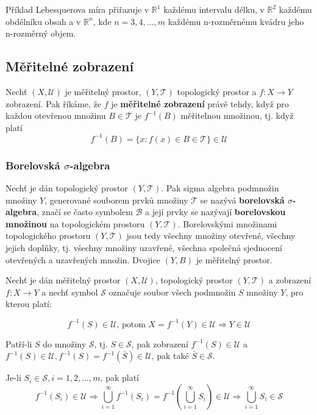 	\begin{note}{Příklad}
	Lebesquerova míra přiřazuje v $\mathbb{R}^1$ každému intervalu délku, v $\mathbb{R}^2$ každému obdélníku obsah a v $\mathbb{R}^n$, kde $n=3,4,\ldots, m$ každému n-rozměrnému kvádru jeho n-rozměrný objem.
	\end{note}
	
	\subsection{Měřitelné zobrazení}
	Nechť $(X,\mathscr{U})$ je měřitelný prostor, $(Y,\mathscr{T})$ topologický prostor a $f:X\to Y$ zobrazení. Pak říkáme, že $f$ je \textbf{měřitelné zobrazení} právě tehdy, když pro každou otevřenou množinu $B\in\mathscr{T}$ je $f^{-1}(B)$ měřitelnou množinou, tj. když platí
	\[ f^{-1}(B)=\big\{ x:f(x)\in B\in\mathscr{T}\big\}\in \mathscr{U} \]
	
	\subsubsection{Borelovská $\sigma$-algebra}
	Nechť je dán topologický prostor $(Y,\mathscr{T})$. Pak sigma algebra podmnožin množiny $Y$, generované souborem prvků množiny $\mathscr{T}$ se nazývá \textbf{borelovská $\sigma$-algebra}, značí se často symbolem $\mathscr{B}$ a její prvky se nazývají \textbf{borelovskou množinou} na topologickém prostoru $(Y,\mathscr{T})$. Borelovskými množinami topologického prostoru $(Y,\mathscr{T})$ jsou tedy všechny množiny otevřené, všechny jejich doplňky, tj. všechny množiny uzavřené, všechna společná sjednocení otevřených a uzavřených množin. Dvojice $(Y,B)$ je měřitelný prostor.\br
	
	Nechť je dán měřitelný prostor $(X,\mathscr{U})$, topologický prostor $(Y,\mathscr{T})$ a zobrazení $f:X\to Y$ a nechť symbol $\mathscr{S}$ označuje soubor všech podmnožin $S$ množiny $Y$, pro kterou platí:
	
	\[ f^{-1}(S)\in \mathscr{U}\text{, potom } X=f^{-1}(Y)\in \mathscr{U} \Rightarrow Y\in \mathscr{U} \]
	
	Patří-li $S$ do množiny $\mathscr{S}$, tj. $S\in\mathscr{S}$, pak zobrazení $f^{-1}(S)\in \mathscr{U}$ a $f^{-1}(S)\in \mathscr{U}, f^{-1}(S) = f^{-1}(\bar{S})\in \mathscr{U}$, pak také $\bar{S}\in\mathscr{S}$.\br
	
	Je-li $S_i\in\mathscr{S}, i=1,2,\ldots,m$, pak platí
	\[ f^{-1}(S_i)\in \mathscr{U} \Rightarrow \bigcup_{i=1}^\infty f^{-1}(S_i) = f^{-1}\left(\bigcup_{i=1}^\infty S_i\right)\in \mathscr{U} \Rightarrow \bigcup_{i=1}^\infty S_i\in\mathscr{S} \]
	
